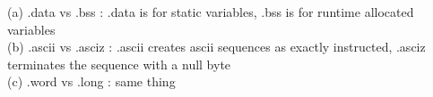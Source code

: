 \documentclass{article}
\begin{document}
\noindent(a) .data vs .bss : .data is for static variables, .bss is for
runtime allocated variables\\
(b) .ascii vs .asciz : .ascii creates ascii sequences as exactly instructed,
.asciz terminates the sequence with a null byte\\
(c) .word vs .long : same thing
\end{document}
